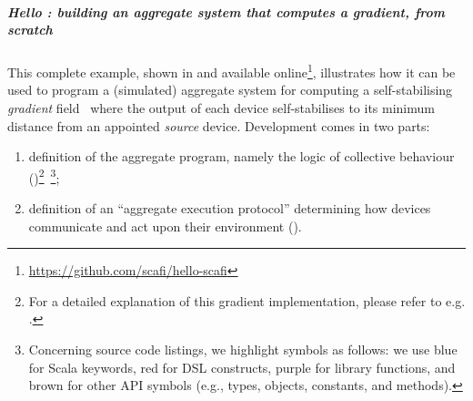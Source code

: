 
\label{sec:examples}
\subparagraph{Hello \scafi{}: building an aggregate system that computes a gradient, from scratch}
This complete example, shown in  and available online\footnote{\url{https://github.com/scafi/hello-scafi}}, illustrates how it \scafi{} can be used
 to program a (simulated) aggregate system
 for computing a self-stabilising \emph{gradient} field~\cite{DBLP:conf/sac/BealBVT08,DBLP:journals/tomacs/ViroliABDP18}
 where the output of each device self-stabilises to
 its minimum distance from an appointed \emph{source} device.
%
Development comes in two parts:
\begin{enumerate}
  \item definition of the aggregate program,
  namely the logic of collective behaviour ()\footnote{For a detailed explanation of this gradient implementation, please refer to e.g. \cite{DBLP:journals/eaai/CasadeiVAPD21}.}~\footnote{Concerning source code listings, we highlight symbols as follows: we use blue for Scala keywords, red for \scafi{} DSL constructs, purple for \scafi{} library functions, and brown for other \scafi{} API symbols (e.g., types, objects, constants, and methods).};
  \item definition of an ``aggregate execution protocol''
  determining how devices communicate and act upon their environment ().
\end{enumerate}

